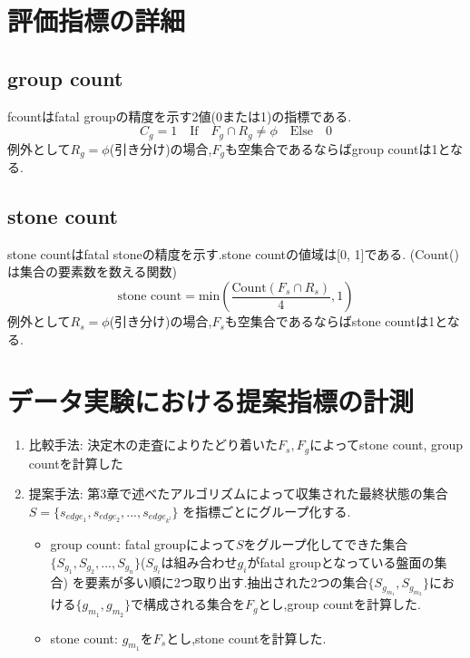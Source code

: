 \section{評価指標の詳細}

\subsection{group count}
fcountはfatal groupの精度を示す2値(0または1)の指標である.
\begin{equation}
	{C_g = 1 \quad \textrm{If} \quad F_g \cap R_g \ne \phi \quad \textrm{Else} \quad 0}
\end{equation}
例外として$R_g=\phi$(引き分け)の場合,$F_g$も空集合であるならばgroup countは1となる.
\subsection{stone count}
stone countはfatal stoneの精度を示す.stone countの値域は[0, 1]である.
(Count()は集合の要素数を数える関数)
\begin{equation}
	{\textrm{stone count} = \textrm{min}(\frac{\textrm{Count}(F_s \cap R_s)}{4}, 1)  }
\end{equation}
例外として$R_s=\phi$(引き分け)の場合,$F_s$も空集合であるならばstone countは1となる.
\section{データ実験における提案指標の計測}

\begin{enumerate}
	\item 比較手法: 決定木の走査によりたどり着いた$F_s, F_g$によってstone count, group countを計算した
	\item 提案手法: 第3章で述べたアルゴリズムによって収集された最終状態の集合$S=\{s_{edge_1}, s_{edge_2}, ..., s_{edge_{k^l}}\}$
	    を指標ごとにグループ化する.
		\begin{itemize}
			\item group count: fatal groupによって$S$をグループ化してできた集合$\{S_{g_1}, S_{g_2}, ..., S_{g_n}\}$($S_{g_i}$は組み合わせ$g_i$がfatal groupとなっている盤面の集合)
			を要素が多い順に2つ取り出す.抽出された2つの集合$\{S_{g_{m_1}}, S_{g_{m_2}}\}$における$\{g_{m_1}, g_{m_2}\}$で構成される集合を$F_g$とし,group countを計算した.
			\item stone count: $g_{m_1}$を$F_s$とし,stone countを計算した.
		\end{itemize}
		
\end{enumerate}

